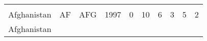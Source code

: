 \documentclass[]{article}
\begin{document}
\begin{longtable}[]{@{}llllllllll@{}}
\begin{minipage}[t]{0.09\columnwidth}
\strut
\end{minipage} & \begin{minipage}[t]{0.09\columnwidth}\raggedright\strut
\strut
\end{minipage} & \begin{minipage}[t]{0.09\columnwidth}\raggedright\strut
\strut
\end{minipage} & \begin{minipage}[t]{0.09\columnwidth}\raggedright\strut
\strut
\end{minipage} & \begin{minipage}[t]{0.09\columnwidth}\raggedright\strut
\strut
\end{minipage}\tabularnewline
\begin{minipage}[t]{0.08\columnwidth}\raggedright\strut
Afghanistan\strut
\end{minipage} & \begin{minipage}[t]{0.04\columnwidth}\raggedright\strut
AF\strut
\end{minipage} & \begin{minipage}[t]{0.04\columnwidth}\raggedright\strut
AFG\strut
\end{minipage} & \begin{minipage}[t]{0.04\columnwidth}\raggedright\strut
1997\strut
\end{minipage} & \begin{minipage}[t]{0.08\columnwidth}\raggedright\strut
0\strut
\end{minipage} & \begin{minipage}[t]{0.09\columnwidth}\raggedright\strut
10\strut
\end{minipage} & \begin{minipage}[t]{0.09\columnwidth}\raggedright\strut
6\strut
\end{minipage} & \begin{minipage}[t]{0.09\columnwidth}\raggedright\strut
3\strut
\end{minipage} & \begin{minipage}[t]{0.09\columnwidth}\raggedright\strut
5\strut
\end{minipage} & \begin{minipage}[t]{0.09\columnwidth}\raggedright\strut
2\strut
\end{minipage}\tabularnewline
\begin{minipage}[t]{0.08\columnwidth}\raggedright\strut
Afghanistan\strut
\end{minipage} & \begin{minipage}[t]{0.04\columnwidth}\raggedright\strut

\end{minipage}
\end{longtable}
\end{document}
